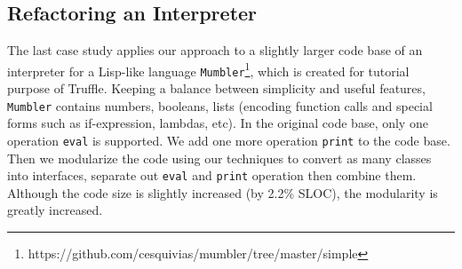 \subsection{Refactoring an Interpreter}
The last case study applies our approach to a slightly larger code base of an
interpreter for a Lisp-like language
\lstinline{Mumbler}\footnote{https://github.com/cesquivias/mumbler/tree/master/simple},
which is created for tutorial purpose of Truffle. Keeping a balance between
simplicity and useful features, \lstinline{Mumbler} contains numbers, booleans,
lists (encoding function calls and special forms such as if-expression, lambdas,
etc). In the original code base, only one operation \texttt{eval} is
supported. We add one more operation \texttt{print} to the code base. Then we
modularize the code using our techniques to convert as many classes into
interfaces, separate out \texttt{eval} and \texttt{print} operation then combine
them. Although the code size is slightly increased (by 2.2\% SLOC), the
modularity is greatly increased.


